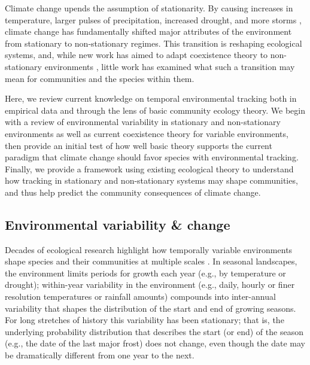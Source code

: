 \documentclass[11pt,letterpaper]{article}
\begin{document}
Climate change upends the assumption of stationarity. By causing increases in temperature, larger pulses of precipitation, increased drought, and more storms \citep{ipcc2013}, climate change has fundamentally shifted major attributes of the environment from stationary to non-stationary regimes. This transition is reshaping ecological systems, and, while new work has aimed to adapt coexistence theory to non-stationary environments \citep{chessonnonstat}, little work has examined what such a transition may mean for communities and the species within them.  %

Here, we review current knowledge on temporal environmental tracking both in empirical data and through the lens of basic community ecology theory. We begin with a review of environmental variability in stationary and non-stationary environments as well as current coexistence theory for variable environments, then provide an initial test of how well basic theory supports the current paradigm that climate change should favor species with environmental tracking. Finally, we provide a framework using existing ecological theory to understand how tracking in stationary and non-stationary systems may shape communities, and thus help predict the community consequences of climate change. 

\subsection{Environmental variability \& change}

Decades of ecological research highlight how temporally variable environments shape species and their communities at multiple scales \citep{Sale:1977oq,Chesson:1997dz}.  In seasonal landscapes, the environment limits periods for growth each year (e.g., by temperature or drought); within-year variability in the environment (e.g., daily, hourly or finer resolution temperatures or rainfall amounts) compounds into inter-annual variability that shapes the distribution of the start and end of growing seasons. For long stretches of history this variability has been stationary; that is, the underlying probability distribution that describes the start (or end) of the season (e.g., the date of the last major frost) does not change, even though the date may be dramatically different from one year to the  next. %
\end{document}
